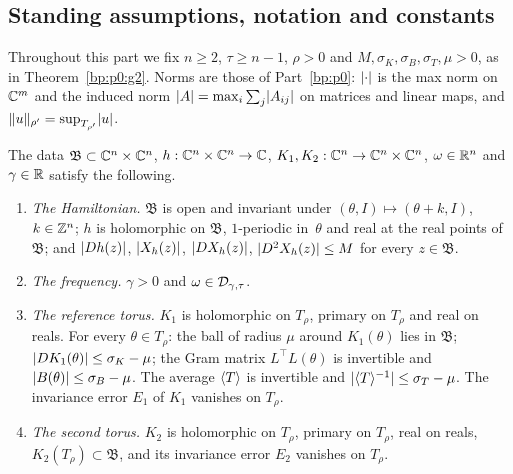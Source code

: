 \subsection{Standing assumptions, notation and constants}\label{bp:p3:setting}

Throughout this part we fix $n\ge2$, $\tau\ge n-1$, $\rho>0$ and $M,\sigma_K,\sigma_B,\sigma_T,\mu>0$, as
in Theorem~\ref{bp:p0:g2}. Norms are those of Part~\ref{bp:p0}: $\lvert \cdot\rvert$ is the max norm on $\mathbb{C}^m$
and the induced norm $\lvert A\rvert=\max_i\sum_j\lvert A_{ij}\rvert$ on matrices and linear maps, and
$\lVert u\rVert_{\rho'}=\sup_{T_{\rho'}}\lvert u\rvert$.

\begin{assumption}\label{bp:p3:standing}
The data $\mathfrak B\subset\mathbb{C}^n\times\mathbb{C}^n$, $h:\mathbb{C}^n\times\mathbb{C}^n\to\mathbb{C}$,
$K_1,K_2:\mathbb{C}^n\to\mathbb{C}^n\times\mathbb{C}^n$, $\omega\in\mathbb{R}^n$ and $\gamma\in\mathbb{R}$ satisfy the following.
\begin{enumerate}[label=(S\arabic*)]
\item \emph{The Hamiltonian.} $\mathfrak B$ is open and invariant under $(\theta,I)\mapsto(\theta+k,I)$,
  $k\in\mathbb{Z}^n$; $h$ is holomorphic on $\mathfrak B$, $1$-periodic in~$\theta$ and real at the real points
  of~$\mathfrak B$; and $\lvert Dh(z)\rvert$, $\lvert X_h(z)\rvert$, $\lvert DX_h(z)\rvert$, $\lvert D^2X_h(z)\rvert\le M$ for every
  $z\in\mathfrak B$.
\item \emph{The frequency.} $\gamma>0$ and $\omega\in\mathcal{D}_{\gamma,\tau}$.
\item \emph{The reference torus.} $K_1$ is holomorphic on $T_\rho$, primary on $T_\rho$ and real on
  reals. For every $\theta\in T_\rho$: the ball of radius $\mu$ around $K_1(\theta)$ lies in
  $\mathfrak B$; $\lvert DK_1(\theta)\rvert\le\sigma_K-\mu$; the Gram matrix $L^\top L(\theta)$ is invertible
  and $\lvert B(\theta)\rvert\le\sigma_B-\mu$. The average $\langle T\rangle$ is invertible and
  $\lvert \langle T\rangle^{-1}\rvert\le\sigma_T-\mu$. The invariance error $E_1$ of $K_1$ vanishes on $T_\rho$.
\item \emph{The second torus.} $K_2$ is holomorphic on $T_\rho$, primary on $T_\rho$, real on reals,
  $K_2(T_\rho)\subset\mathfrak B$, and its invariance error $E_2$ vanishes on $T_\rho$.
\end{enumerate}
\end{assumption}

